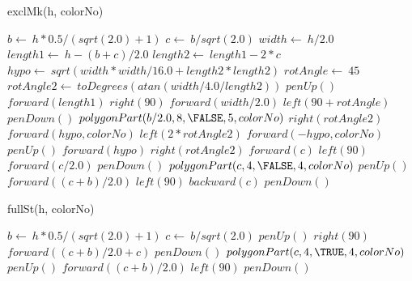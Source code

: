 \documentclass[a4paper,10pt]{article}
\begin{document}
\begin{algorithm}
\caption{exclMk(h, colorNo)}
\begin{algorithmic}[5]

\STATE {}
\STATE {}
  \STATE \(b\gets\ h*0.5/(sqrt(2.0)+1)\)
  \STATE \(c\gets\ b/sqrt(2.0)\)
  \STATE \(width\gets\ h/2.0\)
  \STATE \(length1\gets\ h-(b+c)/2.0\)
  \STATE \(length2\gets\ length1-2*c\)
  \STATE \(hypo\gets\ sqrt(width*width/16.0+length2*length2)\)
  \STATE \(rotAngle\gets\ 45\)
  \STATE \(rotAngle2\gets\ toDegrees(atan(width/4.0/length2))\)
  \STATE \(penUp()\)
  \STATE \(forward(length1)\)
  \STATE \(right(90)\)
  \STATE \(forward(width/2.0)\)
  \STATE \(left(90+rotAngle)\)
  \STATE \(penDown()\)
  \STATE {}
  \STATE {}
  \STATE \(polygonPart(b/2.0,8,\FALSE,5,colorNo)\)
  \STATE \(right(rotAngle2)\)
  \STATE \(forward(hypo,colorNo)\)
  \STATE \(left(2*rotAngle2)\)
  \STATE \(forward(-hypo,colorNo)\)
  \STATE \(penUp()\)
  \STATE \(forward(hypo)\)
  \STATE \(right(rotAngle2)\)
  \STATE \(forward(c)\)
  \STATE \(left(90)\)
  \STATE \(forward(c/2.0)\)
  \STATE \(penDown()\)
  \STATE {}
  \STATE {}
  \STATE \(polygonPart(c,4,\FALSE,4,colorNo)\)
  \STATE \(penUp()\)
  \STATE \(forward((c+b)/2.0)\)
  \STATE \(left(90)\)
  \STATE \(backward(c)\)
  \STATE \(penDown()\)

\end{algorithmic}
\end{algorithm}


\begin{algorithm}
\caption{fullSt(h, colorNo)}
\begin{algorithmic}[5]

\STATE {}
\STATE {}
  \STATE \(b\gets\ h*0.5/(sqrt(2.0)+1)\)
  \STATE \(c\gets\ b/sqrt(2.0)\)
  \STATE \(penUp()\)
  \STATE \(right(90)\)
  \STATE \(forward((c+b)/2.0+c)\)
  \STATE \(penDown()\)
  \STATE {}
  \STATE {}
  \STATE \(polygonPart(c,4,\TRUE,4,colorNo)\)
  \STATE \(penUp()\)
  \STATE \(forward((c+b)/2.0)\)
  \STATE \(left(90)\)
  \STATE \(penDown()\)

\end{algorithmic}
\end{algorithm}
\end{document}
